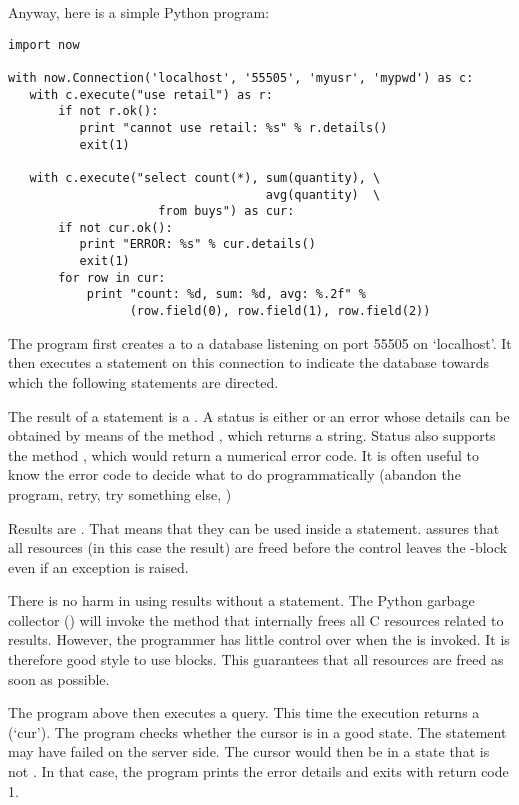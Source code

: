 Anyway, here is a simple Python program:

\begin{python}
\begin{lstlisting}
import now

with now.Connection('localhost', '55505', 'myusr', 'mypwd') as c:
   with c.execute("use retail") as r:
       if not r.ok():
          print "cannot use retail: %s" % r.details()
          exit(1)

   with c.execute("select count(*), sum(quantity), \
                                    avg(quantity)  \
                     from buys") as cur:
       if not cur.ok():
          print "ERROR: %s" % cur.details()
          exit(1)
       for row in cur:
           print "count: %d, sum: %d, avg: %.2f" %
                 (row.field(0), row.field(1), row.field(2))
\end{lstlisting}
\end{python}

The program first creates a 
to a database listening on port 55505 on `localhost'.
It then executes a \term{use} statement on this connection
to indicate the database towards which
the following statements are directed.

The result of a  statement is a .
A status is either  or an error
whose details can be obtained by means of the method
\term{details()}, which returns a string.
Status also supports the method \term{code()},
which would return a numerical error code.
It is often useful to know the error code to decide
what to do programmatically (abandon the program,
retry, try something else, \etc)

Results are . That means
that they can be used inside a  statement.
 assures that all resources (in this case
the result) are freed before the control leaves
the -block even if an exception is raised.

There is no harm in using results without a \term{with} statement.
The Python garbage collector () will invoke the method
that internally frees all C resources related to results.
However, the programmer has little control over when
the \acronym{gc} is invoked. It is therefore good style
to use \term{with} blocks. This guarantees that all resources
are freed as soon as possible.

The program above then executes a query.
This time the execution returns a  (`cur').
The program checks whether the cursor is
in a good state. The statement may have
failed on the server side. The cursor would
then be in a state that is not .
In that case, the program prints the error details
and exits with return code 1.

